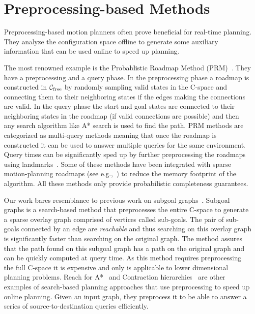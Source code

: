 \documentclass[a4paper]{report}
\begin{document}
\section{Preprocessing-based Methods}
Preprocessing-based motion planners often prove beneficial for real-time planning. They analyze the configuration space offline to generate some auxiliary information that can be used online to speed up planning. 

The most renowned example is the Probablistic Roadmap Method (PRM)~\cite{kavraki1996probabilistic}. They have a preprocessing and a query phase. In the preprocessing phase a roadmap is constructed in $\mathcal{C}_{\rm free}$ by randomly sampling valid states in the C-space and connecting them to their neighboring states if the edges making the connections are valid. In the query phase the start and goal states are connected to their neighboring states in the roadmap (if valid connections are possible) and then any search algorithm like A* search is used to find the path. PRM methods are categorized as multi-query methods meaning that once the roadmap is constructed it can be used to answer multiple queries for the same environment. Query times can be significantly sped up by further preprocessing the roadmaps using landmarks~\cite{paden2017landmark}. Some of these methods have been integrated with sparse motion-planning roadmaps (see e.g.,~\cite{SSAH14,DB14}) to reduce the memory footprint of the algorithm. All these methods only provide probabilistic completeness guarantees.

Our work bares resemblance to previous work on 
subgoal graphs~\cite{UK17,UK18}.
Subgoal graphs is a search-based method that preprocesses the entire C-space to generate a sparse overlay graph comprised of vertices called sub-goals. The pair of sub-goals connected by an edge are \emph{reachable} and thus searching on this overlay graph is significantly faster than searching on the original graph. The method assures that the path found on this subgoal graph has a path on the original graph and can be quickly computed at query time. As this method requires preprocessing the full C-space it is expensive and only is applicable to lower dimensional planning problems.
Reach for A*~\cite{goldberg2006reach} and Contraction hierarchies~\cite{geisberger2008contraction} are other examples of search-based planning approaches that use preprocessing to speed up online planning. Given an input graph, they preprocess it to be able to answer a series of source-to-destination queries efficiently.
\end{document}
